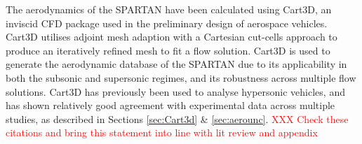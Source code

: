 The aerodynamics of the SPARTAN have been calculated using Cart3D, an inviscid CFD package used in the preliminary design of aerospace vehicles. Cart3D utilises adjoint mesh adaption with a Cartesian cut-cells approach to produce an iteratively refined mesh to fit a flow solution. Cart3D is used to generate the aerodynamic database of the SPARTAN due to its applicability in both the subsonic
and supersonic regimes, and its robustness across multiple flow solutions\cite{Sagerman2017,Abeynayake,Aftosmis2011,Almosnino2016a,Gomez2004}. Cart3D has previously been used to
analyse hypersonic vehicles, and has shown relatively good agreement with experimental data across multiple studies\cite{Sagerman2017,Abeynayake,Aftosmis2011,Almosnino2016a}, as described in Sections \ref{sec:Cart3d} \& \textcolor{red}{\ref{sec:aerounc}}.
\textcolor{red}{XXX Check these citations and bring this statement into line with lit review and appendix}

